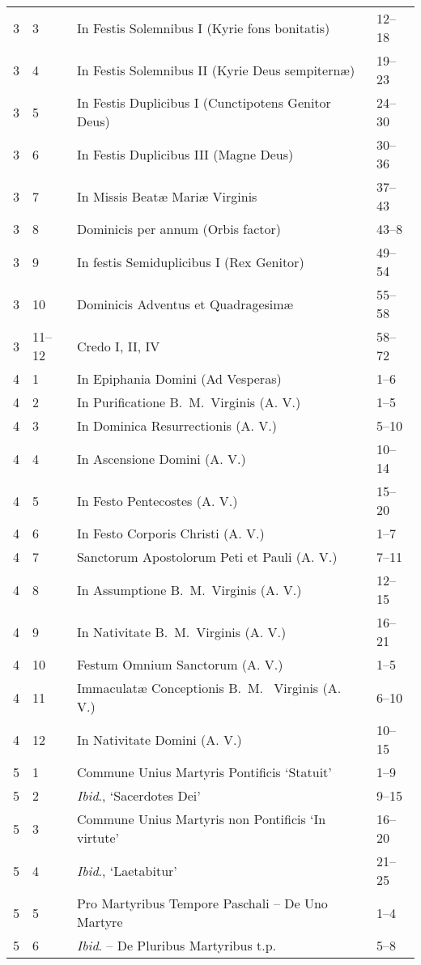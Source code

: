 \begin{landscape}
\begin{longtable}[c]{@{}llll@{}}
3 & 3 & In Festis Solemnibus I (Kyrie fons bonitatis) & 12--18 \\
3 & 4 & In Festis Solemnibus II (Kyrie Deus sempiternæ) & 19--23 \\
3 & 5 & In Festis Duplicibus I (Cunctipotens Genitor Deus) & 24--30 \\
3 & 6 & In Festis Duplicibus III (Magne Deus) & 30--36 \\
3 & 7 & In Missis Beatæ Mariæ Virginis & 37--43 \\
3 & 8 & Dominicis per annum (Orbis factor) & 43--8 \\
3 & 9 & In festis Semiduplicibus I (Rex Genitor) & 49--54 \\
3 & 10 & Dominicis Adventus et Quadragesimæ & 55--58 \\
3 & 11--12 & Credo I, II, IV & 58--72 \\
4 & 1 & In Epiphania Domini (Ad Vesperas) & 1--6 \\
4 & 2 & In Purificatione B.~M.~Virginis (A. V.) & 1--5 \\
4 & 3 & In Dominica Resurrectionis (A. V.) & 5--10 \\
4 & 4 & In Ascensione Domini (A. V.) & 10--14 \\
4 & 5 & In Festo Pentecostes (A. V.) & 15--20 \\
4 & 6 & In Festo Corporis Christi (A. V.) & 1--7 \\
4 & 7 & Sanctorum Apostolorum Peti et Pauli (A. V.) & 7--11 \\
4 & 8 & In Assumptione B.~M.~Virginis (A. V.) & 12--15 \\
4 & 9 & In Nativitate B.~M.~Virginis (A. V.) & 16--21 \\
4 & 10 & Festum Omnium Sanctorum (A. V.) & 1--5 \\
4 & 11 & Immaculatæ Conceptionis B.~M.~ Virginis (A. V.) & 6--10 \\
4 & 12 & In Nativitate Domini (A. V.) & 10--15 \\
5 & 1 & Commune Unius Martyris Pontificis `Statuit' & 1--9 \\
5 & 2 & \emph{Ibid}., `Sacerdotes Dei' & 9--15 \\
5 & 3 & Commune Unius Martyris non Pontificis `In virtute' & 16--20 \\
5 & 4 & \emph{Ibid}., `Laetabitur' & 21--25 \\
5 & 5 & Pro Martyribus Tempore Paschali -- De Uno Martyre & 1--4 \\
5 & 6 & \emph{Ibid}. -- De Pluribus Martyribus t.p. & 5--8 \\

\end{longtable}
\end{landscape}
